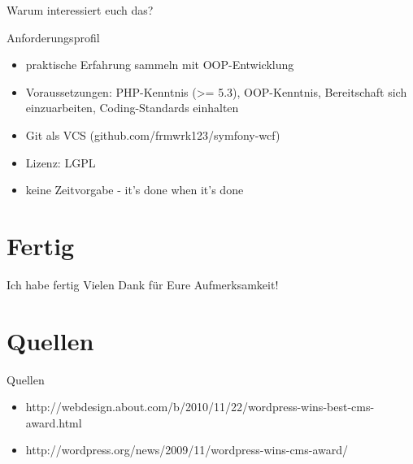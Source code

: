 \documentclass{beamer}
\begin{document}
\begin{frame}
	\centering
	Warum interessiert euch das?
\end{frame}

\begin{frame}{Anforderungsprofil}
	\begin{itemize}
		\item	praktische Erfahrung sammeln mit OOP-Entwicklung
		\item	Voraussetzungen: PHP-Kenntnis (>= 5.3), OOP-Kenntnis, Bereitschaft sich einzuarbeiten, Coding-Standards einhalten
		\item	Git als VCS (github.com/frmwrk123/symfony-wcf)
		\item	Lizenz: LGPL
		\item	keine Zeitvorgabe - it's done when it's done
	\end{itemize}
\end{frame}

\section{Fertig}
\begin{frame}{Ich habe fertig}
	\centering
	Vielen Dank für Eure Aufmerksamkeit!
\end{frame}


\section{Quellen}
\begin{frame}{Quellen}
	\begin{itemize}	
		\item	http://webdesign.about.com/b/2010/11/22/wordpress-wins-best-cms-award.html
		\item	http://wordpress.org/news/2009/11/wordpress-wins-cms-award/
	\end{itemize}
\end{frame}
\end{document}
